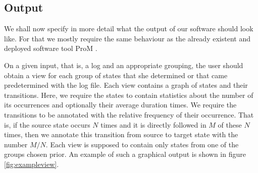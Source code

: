 \documentclass[12pt]{extarticle}
\begin{document}
\subsection{Output}

We shall now specify in more detail what the output of our software should look like. For that we mostly require the same behaviour as the already existent and deployed software tool ProM \cite{prom}.

On a given input, that is, a log and an appropriate grouping, the user should obtain a view for each group of states that she determined or that came predetermined with the log file. Each view contains a graph of states and their transitions. Here, we require the states to contain statistics about the number of its occurrences and optionally their average duration times. We require the transitions to be annotated with the relative frequency of their occurrence. That is, if the source state occurs $N$ times and it is directly followed in $M$ of these $N$ times, then we annotate this transition from source to target state with the number $M / N$. Each view is supposed to contain only states from one of the groups chosen prior. An example of such a graphical output is shown in figure \ref{fig:exampleview}.
\end{document}
